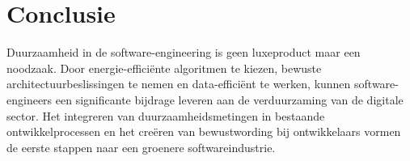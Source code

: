 \documentclass[
    language=dutch,
    doctype=article,
]{../../omnilatex}
\begin{document}
\section{Conclusie}
Duurzaamheid in de software-engineering is geen luxeproduct maar een noodzaak. Door energie-efficiënte algoritmen te kiezen, bewuste architectuurbeslissingen te nemen en data-efficiënt te werken, kunnen software-engineers een significante bijdrage leveren aan de verduurzaming van de digitale sector. Het integreren van duurzaamheidsmetingen in bestaande ontwikkelprocessen en het creëren van bewustwording bij ontwikkelaars vormen de eerste stappen naar een groenere softwareindustrie.
\end{document}
